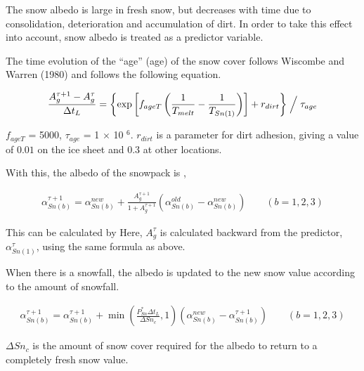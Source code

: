 The snow albedo is large in fresh snow, but decreases with time due to
consolidation, deterioration and accumulation of dirt. In order to take
this effect into account, snow albedo is treated as a predictor
variable.

The time evolution of the ``age'' (age) of the snow cover follows
Wiscombe and Warren (1980) and follows the following equation.

\begin{eqnarray}
 \frac {A_{g}^{\tau +1} - A_{g}^{\tau}}{\Delta t_L}
 = \left\{
\exp \left[ f_{ageT} \left( \frac{1}{T_{melt}}-\frac{1}{T_{Sn(1)}}\right) \right]
  + r_{dirt} \right\} \Bigm/ {\tau_{age}}
\end{eqnarray}

\(f_{ageT}\) = 5000, \(\tau_{age}\) = 1 \(\times\) 10 \(^6\).
\(r_{dirt}\) is a parameter for dirt adhesion, giving a value of
\(0.01\) on the ice sheet and \(0.3\) at other locations.

With this, the albedo of the snowpack is ,

\begin{eqnarray}
 \alpha_{Sn(b)}^{\tau+1} = \alpha_{Sn(b)}^{new} + \frac{A_g^{\tau+1}}{1+A_g^{\tau+1}} (\alpha_{Sn(b)}^{old} - \alpha_{Sn(b)}^{new}) \qquad (b=1,2,3)
\end{eqnarray}

This can be calculated by Here, \(A_g^{\tau}\) is calculated backward
from the predictor, \(\alpha_{Sn(1)}^{\tau}\), using the same formula as
above.

When there is a snowfall, the albedo is updated to the new snow value
according to the amount of snowfall.

\begin{eqnarray}
 \alpha_{Sn(b)}^{\tau+1} = \alpha_{Sn(b)}^{\tau+1}
+ \min\left( \frac{P_{Sn}^* \Delta t_L}{\Delta{Sn_c}}, 1 \right) (\alpha_{Sn(b)}^{new} - \alpha_{Sn(b)}^{\tau+1}) \qquad (b=1,2,3)
\end{eqnarray}

\(\Delta {Sn_c}\) is the amount of snow cover required for the albedo to
return to a completely fresh snow value.
